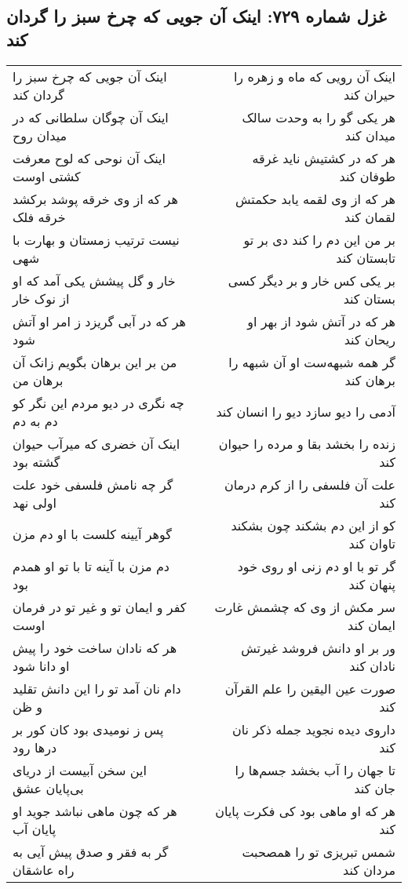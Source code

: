 \begin{center}
\section*{غزل شماره ۷۲۹: اینک آن جویی که چرخ سبز را گردان کند}
\label{sec:0729}
\begin{longtable}{l p{0.5cm} r}
اینک آن جویی که چرخ سبز را گردان کند
&&
اینک آن رویی که ماه و زهره را حیران کند
\\
اینک آن چوگان سلطانی که در میدان روح
&&
هر یکی گو را به وحدت سالک میدان کند
\\
اینک آن نوحی که لوح معرفت کشتی اوست
&&
هر که در کشتیش ناید غرقه طوفان کند
\\
هر که از وی خرقه پوشد برکشد خرقه فلک
&&
هر که از وی لقمه یابد حکمتش لقمان کند
\\
نیست ترتیب زمستان و بهارت با شهی
&&
بر من این دم را کند دی بر تو تابستان کند
\\
خار و گل پیشش یکی آمد که او از نوک خار
&&
بر یکی کس خار و بر دیگر کسی بستان کند
\\
هر که در آبی گریزد ز امر او آتش شود
&&
هر که در آتش شود از بهر او ریحان کند
\\
من بر این برهان بگویم زانک آن برهان من
&&
گر همه شبهه‌ست او آن شبهه را برهان کند
\\
چه نگری در دیو مردم این نگر کو دم به دم
&&
آدمی را دیو سازد دیو را انسان کند
\\
اینک آن خضری که میرآب حیوان گشته بود
&&
زنده را بخشد بقا و مرده را حیوان کند
\\
گر چه نامش فلسفی خود علت اولی نهد
&&
علت آن فلسفی را از کرم درمان کند
\\
گوهر آیینه کلست با او دم مزن
&&
کو از این دم بشکند چون بشکند تاوان کند
\\
دم مزن با آینه تا با تو او همدم بود
&&
گر تو با او دم زنی او روی خود پنهان کند
\\
کفر و ایمان تو و غیر تو در فرمان اوست
&&
سر مکش از وی که چشمش غارت ایمان کند
\\
هر که نادان ساخت خود را پیش او دانا شود
&&
ور بر او دانش فروشد غیرتش نادان کند
\\
دام نان آمد تو را این دانش تقلید و ظن
&&
صورت عین الیقین را علم القرآن کند
\\
پس ز نومیدی بود کان کور بر درها رود
&&
داروی دیده نجوید جمله ذکر نان کند
\\
این سخن آبیست از دریای بی‌پایان عشق
&&
تا جهان را آب بخشد جسم‌ها را جان کند
\\
هر که چون ماهی نباشد جوید او پایان آب
&&
هر که او ماهی بود کی فکرت پایان کند
\\
گر به فقر و صدق پیش آیی به راه عاشقان
&&
شمس تبریزی تو را همصحبت مردان کند
\\
\end{longtable}
\end{center}

